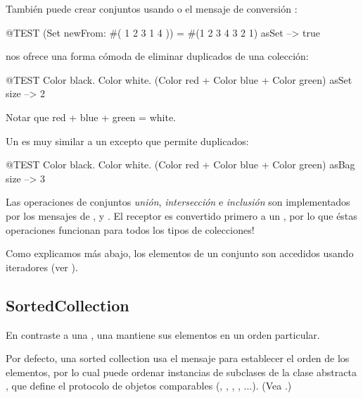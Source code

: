 \documentclass[a4paper,10pt,twoside]{book}
\begin{document}
Tambi\'en puede crear conjuntos usando  o el mensaje de conversi\'on :

\begin{code}{@TEST}
(Set newFrom: #( 1 2 3 1 4 )) = #(1 2 3 4 3 2 1) asSet --> true
\end{code}

 nos ofrece una forma c\'omoda de eliminar duplicados de una colecci\'on:
\begin{code}{@TEST}
{ Color black. Color white. (Color red + Color blue + Color green) } asSet size --> 2
\end{code}
\noindent
Notar que red + blue + green = white.

Un  es muy similar a un  excepto que permite duplicados:
\begin{code}{@TEST}
{ Color black. Color white. (Color red + Color blue + Color green) } asBag size --> 3
\end{code}

Las operaciones de conjuntos \emph{uni\'on}, \emph{intersecci\'on} e \emph{inclusi\'on} son implementados por los mensajes de   ,  y .
El receptor es convertido primero a un , por lo que \'estas operaciones funcionan para todos los tipos de colecciones!


Como explicamos m\'as abajo, los elementos de un conjunto son accedidos usando iteradores (ver ).

\subsection{SortedCollection}
En contraste a una , una  mantiene sus elementos en un orden particular. 

Por defecto, una sorted collection usa el mensaje  para establecer el orden de los elementos, por lo cual puede ordenar instancias de subclases de la clase abstracta , que define el protocolo de objetos comparables (, , , , ...).
(Vea .)
\end{document}
